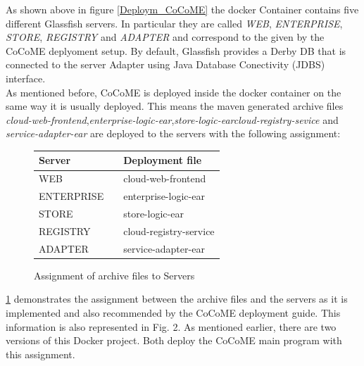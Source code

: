 	As shown above in figure \ref*{Deploym_CoCoME} the docker Container contains five different Glassfish servers. In particular they are called \textit{WEB}, \textit{ENTERPRISE}, \textit{STORE}, \textit{REGISTRY} and \textit{ADAPTER} and correspond to the given by the CoCoME deplyoment setup. By default, Glassfish provides a Derby DB that is connected to the server Adapter using Java Database Conectivity (JDBS) interface.\\
	As mentioned before, CoCoME is deployed inside the docker container on the same way it is usually deployed. This means the maven generated archive files \textit{cloud-web-frontend},\textit{enterprise-logic-ear},\textit{store-logic-ear}\textit{cloud-registry-sevice} and \textit{service-adapter-ear} are deployed to the servers with the following assignment:
	\begin{figure}[H]
		\centering
		\begin{tabular}{p{}|p{}p{}}
			Server && Deployment file \\
			\hline
			WEB && cloud-web-frontend  \\
			ENTERPRISE && enterprise-logic-ear  \\
			STORE && store-logic-ear  \\
			REGISTRY && cloud-registry-service  \\
			ADAPTER && service-adapter-ear \\	
		\end{tabular}
		\caption{Assignment of archive files to Servers}
		\label{table_assignment}
	\end{figure}
	\ref{table_assignment} demonstrates the assignment between the archive files and the servers as it is implemented and also recommended by the CoCoME deployment guide. This information is also represented in Fig. 2. As mentioned earlier, there are two versions of this Docker project. Both deploy the CoCoME main program with this assignment.\\ \\
	
